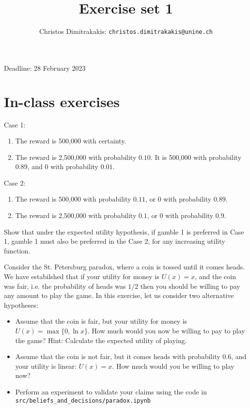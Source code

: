 \documentclass[twoside,a4paper]{article}
\begin{document}
\title{Exercise set 1}
\author{Christos Dimitrakakis: \texttt{christos.dimitrakakis@unine.ch}}

\maketitle
\large{Deadline: 28 February 2023}

\vspace{1em}

\section{In-class exercises}
\begin{exercise}
  Case 1:
  \begin{enumerate}
  \item The reward is 500,000 with certainty.
  \item The reward is 2,500,000 with probability $0.10$. It is 500,000 with probability $0.89$, and 0 with probability $0.01$.
  \end{enumerate}

  Case 2:
  \begin{enumerate}
  \item The reward is 500,000 with probability $0.11$, or 0 with probability $0.89$.
  \item The reward is 2,500,000 with probability $0.1$, or 0 with probability $0.9$.
  \end{enumerate}

  Show that under the expected utility hypothesis, if gamble 1 is preferred in Case 1, gamble 1 must also be preferred in the Case 2, for any increasing utility function.
\end{exercise}

\begin{exercise}[15]
  Consider the St. Petersburg paradox, where a coin is tossed until it comes heads. 
  We have estabilshed that if your utility for money is $U(x) = x$, and the coin was fair, i.e. the probability of heads was $1/2$
  then you should be willing to pay any amount to play the game. In this exercise, let us consider two alternative hypotheses:
  \begin{itemize}
  \item  Assume that the coin is fair, but your utility for money is $U(x) = \max \{0, \ln x\}$. How much
    would you now be willing to pay to play the game? Hint: Calculate the expected utility of playing.
  \item Assume that the coin is not fair, but it comes heads with probability 0.6, and your
    utility is linear: $U(x) = x$. How much would you be willing to play now?
  \item Perform an experiment to validate your claims using the code in \verb!src/beliefs_and_decisions/paradox.ipynb!
  \end{itemize}
\end{exercise}
\end{document}
